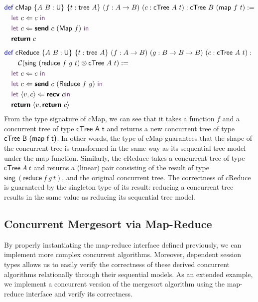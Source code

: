 \vspace{-1em}
\begingroup
\small
\addtolength{\jot}{-0.2em}
\begin{align*}
  &\Def\ \textsf{cMap}\ \{A\ B : \Un\}\ \{t : \textsf{tree}\ A\}\ (f : A \rightarrow B)\ (c : \textsf{cTree}\ A\ t) : \textsf{cTree}\ B\ (\textsf{map}\ f\ t) := \\
  &\quad\Let\ c \Leftarrow c\ \In \\
  &\quad\Let\ c \Leftarrow \Send\ c\ (\textsf{Map}\ f)\ \In \\
  &\quad\Return\ c
  \\[0.5em]
  &\Def\ \textsf{cReduce}\ \{A\ B : \Un\}\ \{t : \textsf{tree}\ A\}\ (f : A \rightarrow B)\ (g : B \rightarrow B \rightarrow B)\ (c : \textsf{cTree}\ A\ t) :\\
  &\qquad\CM{\textsf{sing}\ (\textsf{reduce}\ f\ g\ t) \otimes \textsf{cTree}\ A\ t} := \\
  &\quad\Let\ c \Leftarrow c\ \In \\
  &\quad\Let\ c \Leftarrow \Send\ c\ (\textsf{Reduce}\ f\ g)\ \In \\
  &\quad\Let\ \langle{v, c}\rangle \Leftarrow \Recv\ c \In \\
  &\quad\Return\ \langle{v, \Return\ c}\rangle
\end{align*}
\endgroup
From the type signature of \textsf{cMap}, we can see that it takes a function
$f$ and a concurrent tree of type $\textsf{cTree A\ t}$ and
returns a new concurrent tree of type $\textsf{cTree B\ (\textsf{map}\ f\ t)}$.
In other words, the type of \textsf{cMap} guarantees that the shape of the
concurrent tree is transformed in the same way as its sequential tree model under the
\textsf{map} function. Similarly, the \textsf{cReduce} takes a concurrent tree of type
$\textsf{cTree}\ A\ t$ and returns a
(linear) pair consisting of the result of type $\textsf{sing}\ (\textsf{reduce}\ f\ g\ t)$,
and the original concurrent tree. The correctness of \textsf{cReduce} is guaranteed
by the singleton type of its result: reducing a concurrent tree results in the same
value as reducing its sequential tree model.

\subsection{Concurrent Mergesort via Map-Reduce}
By properly instantiating the map-reduce interface defined previously, we can implement
more complex concurrent algorithms. Moreover, dependent session types allows us to easily 
verify the correctness of these derived concurrent algorithms relationally through their 
sequential models. As an extended example, we implement a concurrent version of the mergesort 
algorithm using the map-reduce interface and verify its correctness.

